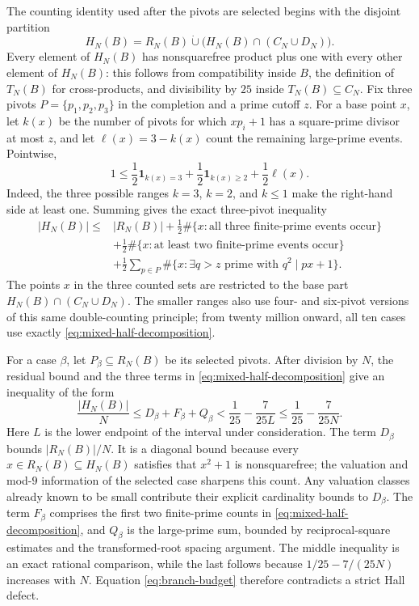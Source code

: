 \documentclass[11pt]{article}
\theoremstyle{definition}
\newcommand{\CN}{C_N}
\newcommand{\DN}{D_N}
\newcommand{\TN}{T_N}
\newcommand{\RN}{R_N}
\begin{document}
 The counting identity used after the pivots are selected begins with the
 disjoint partition
\[
 H_N(B)=\RN(B)\mathbin{\dot\cup}
       \bigl(H_N(B)\cap(\CN\cup\DN)\bigr).
\]
Every element of $H_N(B)$ has nonsquarefree product plus one with every other
element of $H_N(B)$: this follows from compatibility inside $B$, the
definition of $\TN(B)$ for cross-products, and divisibility by $25$ inside
$\TN(B)\subseteq\CN$.  Fix three pivots $P=\{p_1,p_2,p_3\}$ in the completion
and a prime cutoff $z$.  For a base point $x$, let $k(x)$ be the number of
pivots for which $xp_i+1$ has a square-prime divisor at most $z$, and let
$\ell(x)=3-k(x)$ count the remaining large-prime events.  Pointwise,
\[
 1\leq \frac12\mathbf 1_{k(x)=3}
       +\frac12\mathbf 1_{k(x)\geq2}
       +\frac12\ell(x).
\]
Indeed, the three possible ranges $k=3$, $k=2$, and $k\leq1$ make the
right-hand side at least one.  Summing gives the exact three-pivot inequality
\begin{equation}\label{eq:mixed-half-decomposition}
\begin{split}
 |H_N(B)|\leq{}&|\RN(B)|
 +\frac12\#\{x:\text{all three finite-prime events occur}\}\\
 &+\frac12\#\{x:\text{at least two finite-prime events occur}\}\\
 &+\frac12\sum_{p\in P}
       \#\{x:\exists q>z\text{ prime with }q^2\mid px+1\}.
\end{split}
\end{equation}
The points $x$ in the three counted sets are restricted to the base part
$H_N(B)\cap(\CN\cup\DN)$.  The smaller ranges also use four- and six-pivot
versions of this same double-counting principle; from twenty million onward,
all ten cases use exactly \eqref{eq:mixed-half-decomposition}.

For a case $\beta$, let $P_\beta\subseteq\RN(B)$ be its selected pivots.
After division by $N$, the residual bound and the three terms in
\eqref{eq:mixed-half-decomposition} give an inequality of the form
\begin{equation}\label{eq:branch-budget}
 \frac{|H_N(B)|}{N}
 \leq D_\beta+F_\beta+Q_\beta
 <\frac1{25}-\frac7{25L}
 \leq\frac1{25}-\frac7{25N}.
\end{equation}
Here $L$ is the lower endpoint of the interval under consideration.
 The term $D_\beta$ bounds $|\RN(B)|/N$.  It is a diagonal bound because every
$x\in\RN(B)\subseteq H_N(B)$ satisfies that $x^2+1$ is nonsquarefree; the
valuation and mod-$9$ information of the selected case sharpens this count.
 Any valuation classes already known to be small contribute their explicit
 cardinality bounds to $D_\beta$.  The term $F_\beta$ comprises the first two
 finite-prime counts in \eqref{eq:mixed-half-decomposition}, and
 $Q_\beta$ is the large-prime sum, bounded by reciprocal-square estimates and
the transformed-root spacing argument.  The middle inequality
is an exact rational comparison, while the last follows because
$1/25-7/(25N)$ increases with $N$.  Equation
\eqref{eq:branch-budget} therefore contradicts a strict Hall defect.
\end{document}
